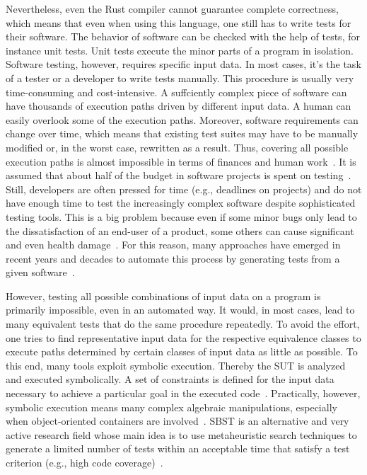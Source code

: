 \documentclass{article}
\begin{document}
Nevertheless, even the Rust compiler cannot guarantee complete correctness, which means that even when using this language, one still has to write tests for their software. The behavior of software can be checked with the help of tests, for instance unit tests. Unit tests execute the minor parts of a program in isolation. Software testing, however, requires specific input data. In most cases, it's the task of a tester or a developer to write tests manually. This procedure is usually very time-consuming and cost-intensive. A suffciently complex piece of software can have thousands of execution paths driven by different input data. A human can easily overlook some of the execution paths. Moreover, software requirements can change over time, which means that existing test suites may have to be manually modified or, in the worst case, rewritten as a result. Thus, covering all possible execution paths is almost impossible in terms of finances and human work~\cite{Myers2012}. It is assumed that about half of the budget in software projects is spent on testing~\cite{Beizer2003}. Still, developers are often pressed for time (e.g., deadlines on projects) and do not have enough time to test the increasingly complex software despite sophisticated testing tools. This is a big problem because even if some minor bugs only lead to the dissatisfaction of an end-user of a product, some others can cause significant and even health damage~\cite{Myers2012}. For this reason, many approaches have emerged in recent years and decades to automate this process by generating tests from a given software~\cite{McMinn_2004}.

However, testing all possible combinations of input data on a program is primarily impossible, even in an automated way. It would, in most cases, lead to many equivalent tests that do the same procedure repeatedly. To avoid the effort, one tries to find representative input data for the respective equivalence classes to execute paths determined by certain classes of input data as little as possible. To this end, many tools exploit symbolic execution. Thereby the \ac{SUT} is analyzed and executed symbolically. A set of constraints is defined for the input data necessary to achieve a particular goal in the executed code~\cite{Clarke1976}. Practically, however, symbolic execution means many complex algebraic manipulations, especially when object-oriented containers are involved~\cite{Korel1990}. \ac{SBST} is an alternative and very active research field whose main idea is to use metaheuristic search techniques to generate a limited number of tests within an acceptable time that satisfy a test criterion (e.g., high code coverage)~\cite{McMinn_2004}. 
\end{document}
